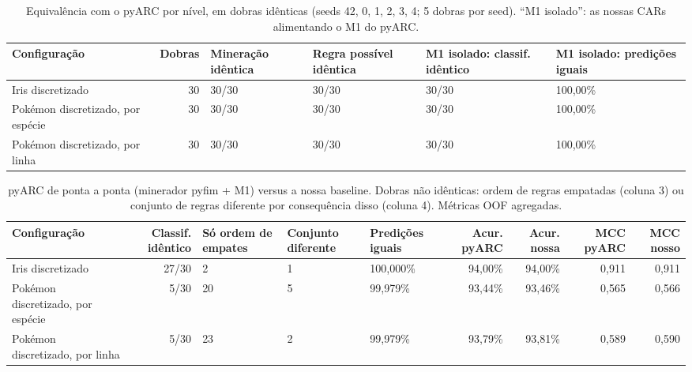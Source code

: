 \documentclass[a4paper,11pt]{article}
\begin{document}
\begin{table}[htbp]
\centering
\small
\caption{Equivalência com o pyARC por nível, em dobras idênticas (seeds 42, 0, 1, 2, 3, 4; 5 dobras por seed). ``M1 isolado'': as nossas CARs alimentando o M1 do pyARC.}
\label{tab:pyarc_niveis}
\begin{tabular}{p{3.6cm}rp{1.8cm}p{1.8cm}p{2.2cm}p{2.1cm}}
\toprule
Configuração & Dobras & Mineração idêntica & Regra possível idêntica & M1 isolado: classif. idêntico & M1 isolado: predições iguais \\
\midrule
Iris discretizado & 30 & 30/30 & 30/30 & 30/30 & 100,00\% \\
Pokémon discretizado, por espécie & 30 & 30/30 & 30/30 & 30/30 & 100,00\% \\
Pokémon discretizado, por linha & 30 & 30/30 & 30/30 & 30/30 & 100,00\% \\
\bottomrule
\end{tabular}
\end{table}

\begin{table}[htbp]
\centering
\small
\caption{pyARC de ponta a ponta (minerador pyfim + M1) versus a nossa baseline. Dobras não idênticas: ordem de regras empatadas (coluna 3) ou conjunto de regras diferente por consequência disso (coluna 4). Métricas OOF agregadas.}
\label{tab:pyarc_ponta}
\begin{tabular}{p{2.9cm}rp{1.3cm}p{1.5cm}p{1.6cm}rrrr}
\toprule
Configuração & Classif. idêntico & Só ordem de empates & Conjunto diferente & Predições iguais & Acur. pyARC & Acur. nossa & MCC pyARC & MCC nosso \\
\midrule
Iris discretizado & 27/30 & 2 & 1 & 100,000\% & 94,00\% & 94,00\% & 0,911 & 0,911 \\
Pokémon discretizado, por espécie & 5/30 & 20 & 5 & 99,979\% & 93,44\% & 93,46\% & 0,565 & 0,566 \\
Pokémon discretizado, por linha & 5/30 & 23 & 2 & 99,979\% & 93,79\% & 93,81\% & 0,589 & 0,590 \\
\bottomrule
\end{tabular}
\end{table}
\end{document}
